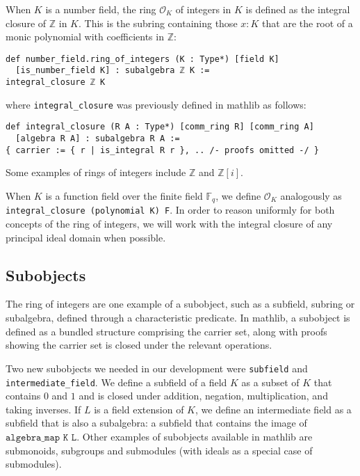 \documentclass[a4paper,USenglish,cleveref, autoref, thm-restate]{lipics-v2021}
\newcommand{\lean}[1]{\texttt{#1}\xspace} %
\newcommand*{\OK}[1][K]{\mathcal{O}_{#1}}
\newcommand*{\Fq}[1][q]{\mathbb{F}_{#1}}
\newcommand{\mathlib}{\textsf{mathlib}\xspace}
\newcommand{\Q}{\mathbb{Q}}
\newcommand{\Z}{\mathbb{Z}}
\begin{document}
When $K$ is a number field, the ring $\OK$ of integers in $K$ is defined as the integral closure of $\Z$ in $K$.
This is the subring containing those $x : K$ that are the root of a monic polynomial with coefficients in $\Z$:
\begin{lstlisting}
def number_field.ring_of_integers (K : Type*) [field K]
  [is_number_field K] : subalgebra ℤ K :=
integral_closure ℤ K
\end{lstlisting}
where \lean{integral\_closure} was previously defined in \mathlib as follows:
\begin{lstlisting}
def integral_closure (R A : Type*) [comm_ring R] [comm_ring A]
  [algebra R A] : subalgebra R A :=
{ carrier := { r | is_integral R r }, .. /- proofs omitted -/ }
\end{lstlisting}
Some examples of rings of integers include $\Z$ and $\Z[i]$. %

When $K$ is a function field over the finite field $\Fq$, we define $\OK$ analogously as \lean{integral\_closure (polynomial K) F}.
In order to reason uniformly for both concepts of the ring of integers,
we will work with the integral closure of any principal ideal domain when possible.

\subsection{Subobjects} \label{sec:subobjects}

The ring of integers are one example of a subobject, such as a subfield, subring or subalgebra, defined through a characteristic predicate.
In \mathlib, a subobject is defined as a bundled structure comprising the carrier set,
along with proofs showing the carrier set is closed under the relevant operations.

Two new subobjects we needed in our development were \lean{subfield} and \lean{intermediate\-\_field}.
We define a subfield of a field $K$ as a subset of $K$ that contains $0$ and $1$ and is closed under addition, negation, multiplication, and taking inverses.
If $L$ is a field extension of $K$, we define an intermediate field as a subfield that is also a subalgebra: a subfield that contains the image of $\lean{algebra\_map K L}$.
Other examples of subobjects available in \mathlib are submonoids, subgroups and submodules (with ideals as a special case of submodules).
\end{document}
